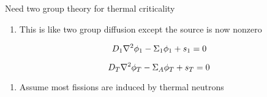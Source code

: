 \documentclass[aspectratio=1610,pdftex,dvipsnames,compress,xcolor={dvipsnames}]{beamer}
\begin{document}
\addtocounter{framenumber}{-1} 
\begin{frame}{Need two group theory for thermal criticality}
    \begin{enumerate}[series=outerlist,topsep=0pt,itemsep=11pt,leftmargin=*,label=(\arabic*)]
        \item[]This is like two group diffusion except the source is now nonzero
    \end{enumerate}

    \vspace*{\fill}

    \begin{equation}
        \LARGE
        D_1 \nabla^2 \phi_1 -\Sigma_1 \phi_1 + s_1=0
    \end{equation}

    \begin{equation}
        \LARGE
        D_T \nabla^2 \phi_T -\Sigma_A \phi_T + s_T=0
    \end{equation}

    \vspace*{\fill}

    \begin{enumerate}[series=outerlist,topsep=0pt,itemsep=11pt,leftmargin=*,label=(\arabic*)]
        \item[]Assume most fissions are induced by thermal neutrons
    \end{enumerate}
\end{frame}
\end{document}
